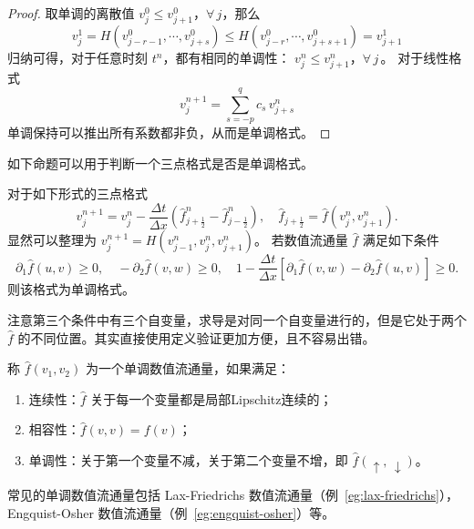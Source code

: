 \begin{proof}
    取单调的离散值 $v_j^0 \le v_{j+1}^0$，$\forall\, j$，那么
    \[
        v_{j}^1 = H(v_{j-r-1}^0,\cdots,v_{j+s}^0)
        \le H(v_{j-r}^0,\cdots,v_{j+s+1}^0) = v_{j+1}^1
    \]
    归纳可得，对于任意时刻 $t^n$，都有相同的单调性： $v_j^n \le v_{j+1}^n$，$\forall\, j$\,。
    对于线性格式
    \[
        v_j^{n+1} = \sum_{s=-p}^q c_s\, v_{j+s}^n
    \]
    单调保持可以推出所有系数都非负，从而是单调格式。
\end{proof}

如下命题可以用于判断一个三点格式是否是单调格式。
\begin{proposition}
    对于如下形式的三点格式
    \[
        v_{j}^{n+1} = v_j^n - \frac{\Delta t}{\Delta x}\left(
        \hat{f}_{j+\frac12}^n - \hat{f}_{j-\frac12}^n
        \right),\quad \hat{f}_{j+\frac12}=\hat{f}(v_j^n,v_{j+1}^n).
    \]
    显然可以整理为 $v_{j}^{n+1} = H(v_{j-1}^n,v_j^n,v_{j+1}^n)$。
    若数值流通量 $\hat{f}$ 满足如下条件
    \[
        \partial_1\hat{f}(u,v) \ge 0,\quad
        - \partial_2 \hat{f}(v,w) \ge 0,\quad
        1 - \frac{\Delta t}{\Delta x}\left[\partial_1 \hat{f}(v,w) - \partial_2 \hat{f}(u,v)\right] \ge 0.
    \]
    则该格式为单调格式。
\end{proposition}

\begin{remark}
    注意第三个条件中有三个自变量，求导是对同一个自变量进行的，但是它处于两个 $\hat{f}$ 的不同位置。其实直接使用定义验证更加方便，且不容易出错。
\end{remark}

\begin{definition}[单调数值流通量]
    称 $\hat{f}(v_1,v_2)$ 为一个单调数值流通量，如果满足：
    \begin{enumerate}
        \item 连续性：$\hat{f}$ 关于每一个变量都是局部Lipschitz连续的；
        \item 相容性：$\hat{f}(v,v) = f(v)$；
        \item 单调性：关于第一个变量不减，关于第二个变量不增，即 $\hat{f}(\uparrow,\, \downarrow)$。
    \end{enumerate}
\end{definition}

\begin{remark}
    常见的单调数值流通量包括 Lax-Friedrichs 数值流通量（例~\ref{eg:lax-friedrichs}），Engquist-Osher 数值流通量（例~\ref{eg:engquist-osher}）等。
\end{remark}

